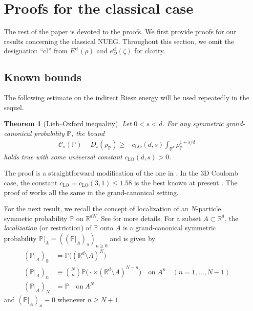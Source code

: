 \documentclass[final,onefignum,onetabnum,reqno]{amsart}
\newtheorem{theorem}{Theorem}[section]
\theoremstyle{remark}
\renewcommand{\le}{\leqslant}
\renewcommand{\ge}{\geqslant}
\newcommand{\RR}{\mathbb{R}}
\newcommand{\PP}{\mathbb{P}}
\newcommand{\cl}{\mathrm{cl}} %
\newcommand{\LO}{\mathrm{LO}} %
\newcommand{\Cc}{\mathcal{C}}
\begin{document}
\section{Proofs for the classical case}\label{clproofs}
The rest of the paper is devoted to the proofs. We first provide proofs for our results concerning the classical NUEG.
Throughout this section, we omit the designation ``$\cl$'' from $E^\cl(\rho)$ and $e_\Omega^\cl(\zeta)$ for clarity.

\subsection{Known bounds}
The following estimate on the indirect Riesz energy will be used repeatedly in the sequel. 
\begin{theorem}[Lieb--Oxford inequality]\label{lobound}
Let $0<s<d$. For any symmetric grand-canonical probability $\PP$, the bound
\begin{align*}
\Cc_s(\PP)-D_s(\rho_\PP)\ge - c_\LO(d,s) \int_{\RR^d} \rho_\PP^{1+s/d}
\end{align*}
holds true with some universal constant $c_\LO(d,s)>0$.
\end{theorem}
The proof is a straightforward modification of the one in \cite{lundholm2016fractional}. 
In the 3D Coulomb case, the constant $c_\LO=c_\LO(3,1)\le 1.58$ is the best known at present \cite{lewin2022improved}. The proof of \cite{lewin2022improved} works all the same in the grand-canonical setting.

For the next result, we recall the concept of localization of an $N$-particle symmetic probability $\PP$ on $\RR^{dN}$. See \cite{di2025grand} for more details. For a subset $A\subset\RR^d$, the \emph{localization} (or restriction) of $\PP$ onto $A$ is a grand-canonical symmetric probability $\PP|_A=((\PP|_A)_n)_{n\ge 0}$ and is given by 
\begin{align*}
(\PP|_A)_0&=\PP\bigl((\RR^d\setminus A)^N\bigr)\\
(\PP|_A)_n&\equiv \binom{N}{n} \PP\bigl(\cdot \times (\RR^d\setminus A)^{N-n}\bigr) \quad \text{on}\;A^n \quad (n=1,\ldots,N-1)\\
(\PP|_A)_N&=\PP \quad \text{on}\;A^N
\end{align*}
and $(\PP|_A)_n\equiv 0$ whenever $n\ge N+1$. 
\end{document}
